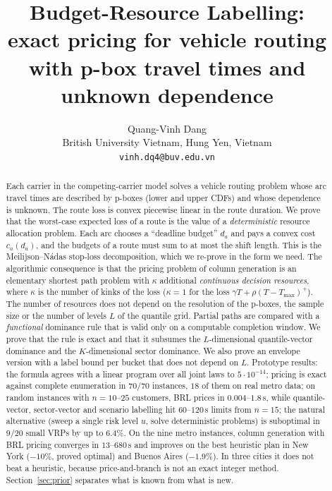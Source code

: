 \documentclass[11pt]{article}
\title{Budget-Resource Labelling:\\ exact pricing for vehicle routing with p-box travel times and unknown dependence}
\author{Quang-Vinh Dang\\ British University Vietnam, Hung Yen, Vietnam\\ \texttt{vinh.dq4@buv.edu.vn}}
\date{}
\theoremstyle{definition}
\begin{document}
\maketitle

\begin{abstract}
Each carrier in the competing-carrier model solves a vehicle routing problem whose arc travel times are described by p-boxes (lower and upper CDFs) and whose dependence is unknown. The route loss is convex piecewise linear in the route duration. We prove that the worst-case expected loss of a route is the value of a \emph{deterministic} resource allocation problem. Each arc chooses a ``deadline budget'' $d_a$ and pays a convex cost $c_a(d_a)$, and the budgets of a route must sum to at most the shift length. This is the Meilijson--N\'adas stop-loss decomposition, which we re-prove in the form we need. The algorithmic consequence is that the pricing problem of column generation is an elementary shortest path problem with $\kappa$ additional \emph{continuous decision resources}, where $\kappa$ is the number of kinks of the loss ($\kappa=1$ for the loss $\gamma T+\rho(T-T_{\max})^+$). The number of resources does not depend on the resolution of the p-boxes, the sample size or the number of levels $L$ of the quantile grid. Partial paths are compared with a \emph{functional} dominance rule that is valid only on a computable completion window. We prove that the rule is exact and that it subsumes the $L$-dimensional quantile-vector dominance and the $K$-dimensional sector dominance. We also prove an envelope version with a label bound per bucket that does not depend on $L$. Prototype results: the formula agrees with a linear program over all joint laws to $5\cdot10^{-14}$; pricing is exact against complete enumeration in $70/70$ instances, $18$ of them on real metro data; on random instances with $n=10$--$25$ customers, BRL prices in $0.004$--$1.8$\,s, while quantile-vector, sector-vector and scenario labelling hit $60$--$120$\,s limits from $n=15$; the natural alternative (sweep a single risk level $u$, solve deterministic problems) is suboptimal in $9/20$ small VRPs by up to $6.4\%$. On the nine metro instances, column generation with BRL pricing converges in $13$--$680$\,s and improves on the best heuristic plan in New York ($-10\%$, proved optimal) and Buenos Aires ($-1.9\%$). In three cities it does not beat a heuristic, because price-and-branch is not an exact integer method. Section~\ref{sec:prior} separates what is known from what is new.
\end{abstract}
\end{document}
